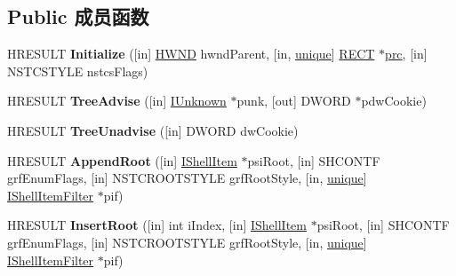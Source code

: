 \subsection*{Public 成员函数}
\begin{DoxyCompactItemize}
\item 
\mbox{\label{interface_i_name_space_tree_control_adf9ab7f88eaccfed516eab45733e47cc}} 
H\+R\+E\+S\+U\+LT {\bfseries Initialize} (\mbox{[}in\mbox{]} \hyperlink{interfacevoid}{H\+W\+ND} hwnd\+Parent, \mbox{[}in, \hyperlink{interfaceunique}{unique}\mbox{]} \hyperlink{structtag_r_e_c_t}{R\+E\+CT} $\ast$\hyperlink{structtag_r_e_c_t}{prc}, \mbox{[}in\mbox{]} N\+S\+T\+C\+S\+T\+Y\+LE nstcs\+Flags)
\item 
\mbox{\label{interface_i_name_space_tree_control_a38c2ae68cb167a5c5fce496895efec93}} 
H\+R\+E\+S\+U\+LT {\bfseries Tree\+Advise} (\mbox{[}in\mbox{]} \hyperlink{interface_i_unknown}{I\+Unknown} $\ast$punk, \mbox{[}out\mbox{]} D\+W\+O\+RD $\ast$pdw\+Cookie)
\item 
\mbox{\label{interface_i_name_space_tree_control_a0c71f3a90d2720d5af06cb7499f23040}} 
H\+R\+E\+S\+U\+LT {\bfseries Tree\+Unadvise} (\mbox{[}in\mbox{]} D\+W\+O\+RD dw\+Cookie)
\item 
\mbox{\label{interface_i_name_space_tree_control_a8fd98bc4cc7c0b7a7668004a0b59f79a}} 
H\+R\+E\+S\+U\+LT {\bfseries Append\+Root} (\mbox{[}in\mbox{]} \hyperlink{interface_i_shell_item}{I\+Shell\+Item} $\ast$psi\+Root, \mbox{[}in\mbox{]} S\+H\+C\+O\+N\+TF grf\+Enum\+Flags, \mbox{[}in\mbox{]} N\+S\+T\+C\+R\+O\+O\+T\+S\+T\+Y\+LE grf\+Root\+Style, \mbox{[}in, \hyperlink{interfaceunique}{unique}\mbox{]} \hyperlink{interface_i_shell_item_filter}{I\+Shell\+Item\+Filter} $\ast$pif)
\item 
\mbox{\label{interface_i_name_space_tree_control_ab39282ad898409c5caa718c4f1efddaf}} 
H\+R\+E\+S\+U\+LT {\bfseries Insert\+Root} (\mbox{[}in\mbox{]} int i\+Index, \mbox{[}in\mbox{]} \hyperlink{interface_i_shell_item}{I\+Shell\+Item} $\ast$psi\+Root, \mbox{[}in\mbox{]} S\+H\+C\+O\+N\+TF grf\+Enum\+Flags, \mbox{[}in\mbox{]} N\+S\+T\+C\+R\+O\+O\+T\+S\+T\+Y\+LE grf\+Root\+Style, \mbox{[}in, \hyperlink{interfaceunique}{unique}\mbox{]} \hyperlink{interface_i_shell_item_filter}{I\+Shell\+Item\+Filter} $\ast$pif)

\end{DoxyCompactItemize}
